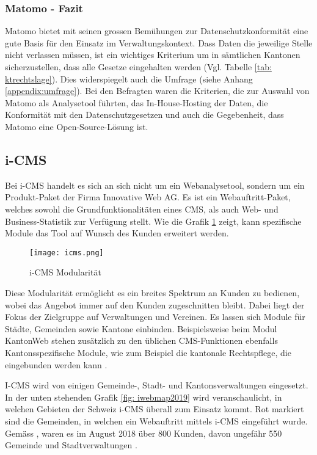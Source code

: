 \subsubsection{Matomo - Fazit}

Matomo bietet mit seinen grossen Bemühungen zur Datenschutzkonformität eine gute Basis für den Einsatz im Verwaltungskontext. Dass Daten die jeweilige Stelle nicht verlassen müssen, ist ein wichtiges Kriterium um in sämtlichen Kantonen sicherzustellen, dass alle Gesetze eingehalten werden (Vgl. Tabelle \ref{tab: ktrechtslage}). Dies widerspiegelt auch die Umfrage (siehe Anhang \ref{appendix:umfrage}). Bei den Befragten waren die Kriterien, die zur Auswahl von Matomo als Analysetool führten, das In-House-Hosting der Daten, die Konformität mit den Datenschutzgesetzen und auch die Gegebenheit, dass Matomo eine Open-Source-Lösung ist.  

\subsection{i-CMS} \label{subsec:icmsmarkt}
Bei i-CMS handelt es sich an sich nicht um ein Webanalysetool, sondern um ein Produkt-Paket der Firma Innovative Web AG. Es ist ein Webauftritt-Paket, welches sowohl die Grundfunktionalitäten eines CMS, als auch Web- und Business-Statistik zur Verfügung stellt\parencite{iwebwebsiteCMS}. Wie die Grafik \ref{fig: icms} zeigt, kann spezifische Module das Tool auf Wunsch des Kunden erweitert werden.


\begin{figure}[h]
  \centering
  \texttt{[image: icms.png]}
  \caption{i-CMS Modularität \parencite{iweb2019revue}}
  \label{fig: icms}
\end{figure}

Diese Modularität ermöglicht es ein breites Spektrum an Kunden zu bedienen, wobei das Angebot immer auf den Kunden zugeschnitten bleibt. Dabei liegt der Fokus der Zielgruppe auf Verwaltungen und Vereinen. Es lassen sich Module für Städte, Gemeinden sowie Kantone einbinden. Beispielsweise beim Modul KantonWeb stehen zusätzlich zu den üblichen CMS-Funktionen ebenfalls Kantonsspezifische Module, wie zum Beispiel die kantonale Rechtspflege, die eingebunden werden kann \parencite{iwebwebsiteKanotonWeb}.

I-CMS wird von einigen Gemeinde-, Stadt- und Kantonsverwaltungen eingesetzt. In der unten stehenden Grafik \ref{fig: iwebmap2019} wird veranschaulicht, in welchen Gebieten der Schweiz i-CMS überall zum Einsatz kommt. Rot markiert sind die Gemeinden, in welchen ein Webauftritt mittels i-CMS eingeführt wurde. Gemäss \parencite[S. 14]{iweb2018revue}, waren es im August 2018 über 800 Kunden, davon ungefähr 550 Gemeinde und Stadtverwaltungen \parencite{iwebwebsiteGemeindeWeb}.

